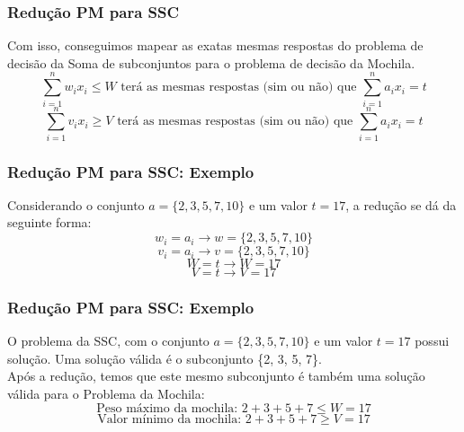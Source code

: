 \documentclass{beamer}
\begin{document}
\begin{frame}
    \frametitle{Redução PM para SSC}
        Com isso, conseguimos mapear as exatas mesmas respostas do problema de decisão da Soma de subconjuntos para o problema de decisão da Mochila.
         \begin{equation*}
            \sum_{i=1}^{n} w_{i} x_{i} \leq W \mbox{ terá as mesmas respostas (sim ou não) que } \sum_{i=1}^{n} a_{i} x_{i} = t
         \end{equation*}
         \begin{equation*}
            \sum_{i=1}^{n} v_{i} x_{i} \geq V \mbox{ terá as mesmas respostas (sim ou não) que } \sum_{i=1}^{n} a_{i} x_{i} = t
         \end{equation*}
\end{frame}

\begin{frame}
    \frametitle{Redução PM para SSC: Exemplo}
        Considerando o conjunto $a = \{2, 3, 5, 7, 10\}$ e um valor $t = 17$, a redução se dá da seguinte forma:
        \begin{equation*}
            w_{i} = a_{i} \longrightarrow w = \{2, 3, 5, 7, 10\}
        \end{equation*}
        \begin{equation*}
            v_{i} = a_{i} \longrightarrow v = \{2, 3, 5, 7, 10\}
        \end{equation*}
        \begin{equation*}
            W = t \longrightarrow W = 17
        \end{equation*}
        \begin{equation*}
            V = t \longrightarrow V = 17
         \end{equation*}
\end{frame}

\begin{frame}
    \frametitle{Redução PM para SSC: Exemplo}
        O problema da SSC, com o conjunto $a = \{2, 3, 5, 7, 10\}$ e um valor $t = 17$ possui solução.
        Uma solução válida é o subconjunto \{2, 3, 5, 7\}.\\
        Após a redução, temos que este mesmo subconjunto é também uma solução válida para o Problema da Mochila:
        \begin{equation*}
            \mbox{Peso máximo da mochila: } 2 + 3 + 5 + 7 \leq W = 17
        \end{equation*}
        \begin{equation*}
            \mbox{Valor mínimo da mochila: } 2 + 3 + 5 + 7 \geq V = 17
        \end{equation*}

\end{frame}
\end{document}
